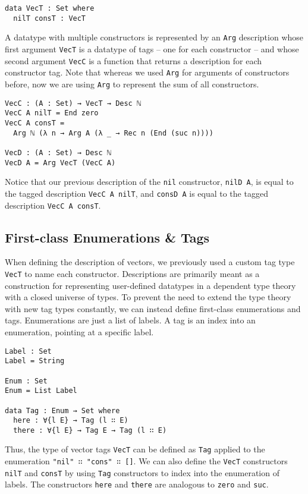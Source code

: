 \documentclass[preprint,nonatbib]{sigplanconf}
\begin{document}
\begin{verbatim}
data VecT : Set where
  nilT consT : VecT
\end{verbatim}

A datatype with multiple constructors is represented by an
{\tt Arg} description whose first argument {\tt VecT} is a datatype of tags
-- one for each constructor -- and whose second argument {\tt VecC} is
a function that returns a description for each constructor tag. Note
that whereas we used {\tt Arg} for arguments of constructors before,
now we are using {\tt Arg} to represent the sum of all constructors.

\begin{verbatim}
VecC : (A : Set) → VecT → Desc ℕ
VecC A nilT = End zero
VecC A consT =
  Arg ℕ (λ n → Arg A (λ _ → Rec n (End (suc n))))

VecD : (A : Set) → Desc ℕ
VecD A = Arg VecT (VecC A)
\end{verbatim}

Notice that our previous description of the {\tt nil} constructor,
{\tt nilD A}, is equal to the tagged description
{\tt VecC A nilT}, and {\tt consD A}
is equal to the tagged description
{\tt VecC A consT}.

\subsection{First-class Enumerations \& Tags}
\label{sec:background:case}

When defining the description of vectors, we previously used a custom
tag type {\tt VecT} to name each constructor. Descriptions are
primarily meant as a construction for representing user-defined
datatypes in a dependent type theory with a closed universe of types.
To prevent the need to extend the type theory with new tag types
constantly, we can instead define first-class enumerations and tags.
Enumerations are just a list of labels. A tag is an index into an
enumeration, pointing at a specific label.

\begin{verbatim}
Label : Set
Label = String

Enum : Set
Enum = List Label

data Tag : Enum → Set where
  here : ∀{l E} → Tag (l ∷ E)
  there : ∀{l E} → Tag E → Tag (l ∷ E)
\end{verbatim}

Thus, the type of vector tags {\tt VecT} can be defined as
{\tt Tag} applied to the enumeration {\tt "nil" ∷ "cons" ∷ []}.
We can also define the {\tt VecT} constructors
{\tt nilT} and {\tt consT} by using
{\tt Tag} constructors to index into the enumeration of labels. The
constructors {\tt here} and {\tt there} are analogous to {\tt zero}
and {\tt suc}.
\end{document}

